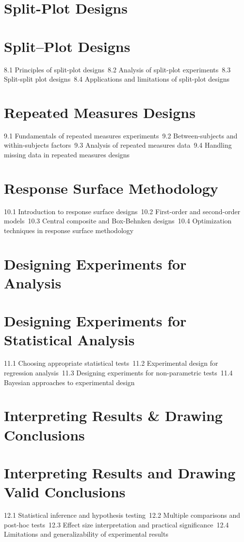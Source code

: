 \section{Split-Plot Designs}
\section{Split–Plot Designs}
8.1 Principles of split-plot designs\
8.2 Analysis of split-plot experiments\
8.3 Split-split plot designs\
8.4 Applications and limitations of split-plot designs\
\section{Repeated Measures Designs}
9.1 Fundamentals of repeated measures experiments\
9.2 Between-subjects and within-subjects factors\
9.3 Analysis of repeated measures data\
9.4 Handling missing data in repeated measures designs\
\section{Response Surface Methodology}
10.1 Introduction to response surface designs\
10.2 First-order and second-order models\
10.3 Central composite and Box-Behnken designs\
10.4 Optimization techniques in response surface methodology\
\section{Designing Experiments for Analysis}
\section{Designing Experiments for Statistical Analysis}
11.1 Choosing appropriate statistical tests\
11.2 Experimental design for regression analysis\
11.3 Designing experiments for non-parametric tests\
11.4 Bayesian approaches to experimental design\
\section{Interpreting Results \& Drawing Conclusions}
\section{Interpreting Results and Drawing Valid Conclusions}
12.1 Statistical inference and hypothesis testing\
12.2 Multiple comparisons and post-hoc tests\
12.3 Effect size interpretation and practical significance\
12.4 Limitations and generalizability of experimental results\
